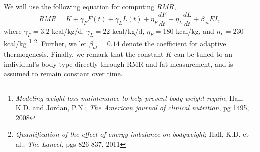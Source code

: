 We will use the following equation for computing $RMR$,
\begin{equation}
RMR = K + \gamma_F F(t) + \gamma_L L(t) + \eta_F \dfrac{dF}{dt} + \eta_L \dfrac{dL}{dt}  + \beta_{at} EI ,
\label{eqn:RMR}
\end{equation}
where $\gamma_F = 3.2$ kcal/kg/d, $\gamma_L = 22$ kcal/kg/d, $\eta_F = 180$ kcal/kg, and $\eta_L = 230$ kcal/kg
\footnote{\emph{Modeling weight-loss maintenance to help prevent body weight regain}; Hall, K.D. and Jordan, P.N.; \emph{The American journal of clinical nutrition}, pg 1495, 2008}
\footnote{\emph{Quantification of the effect of energy imbalance on bodyweight}; Hall, K.D. et al.; \emph{The Lancet}, pgs 826-837, 2011}.
Further, we let $\beta_{at}=0.14$ denote the coefficient for adaptive thermogenesis.
Finally, we remark that the constant $K$ can be tuned to an individual's body type directly through RMR and fat measurement, and is assumed to remain constant over time.
 
